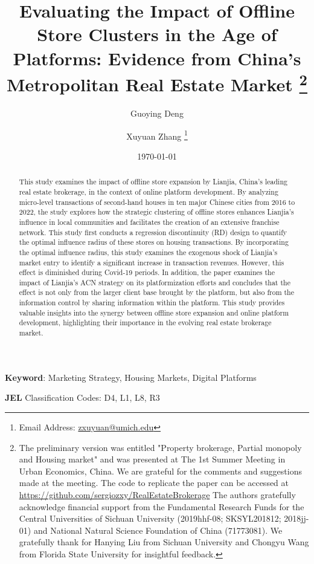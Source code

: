 \documentclass[12pt]{article}
\title{ \vspace*{-2.5cm} \hspace*{-0.5cm}Evaluating the Impact of Offline Store Clusters in the Age of Platforms: Evidence from China's Metropolitan Real Estate Market \footnote{
The preliminary version was entitled "Property brokerage, Partial monopoly and Housing market" and was presented at The 1st Summer Meeting in Urban Economics, China. We are grateful for the comments and suggestions made at the meeting. The code to replicate the paper can be accessed at \href{https://github.com/sergiozxy/RealEstateBrokerage}{https://github.com/sergiozxy/RealEstateBrokerage} The authors gratefully acknowledge financial support from the Fundamental Research Funds for the Central Universities of Sichuan University (2019hhf-08; SKSYL201812; 2018jj-01) and National Natural Science Foundation of China (71773081). We gratefully thank for Hanying Liu from Sichuan University and Chongyu Wang from Florida State University for insightful feedback.
}}
\date{ \vspace*{0.5cm} \today}
\begin{document}
\author[1]{Guoying Deng}
\author[2]{Xuyuan Zhang \thanks{Email Address: \href{mailto:zxuyuan@umich.edu}{zxuyuan@umich.edu}}}

\bgroup
\let\footnoterule\relax

\begin{singlespace}
\maketitle

\begin{abstract}
    \noindent This study examines the impact of offline store expansion by Lianjia, China's leading real estate brokerage, in the context of online platform development. By analyzing micro-level transactions of second-hand houses in ten major Chinese cities from 2016 to 2022, the study explores how the strategic clustering of offline stores enhances Lianjia's influence in local communities and facilitates the creation of an extensive franchise network. This study first conducts a regression discontinuity (RD) design to quantify the optimal influence radius of these stores on housing transactions. By incorporating the optimal influence radius, this study examines the exogenous shock of Lianjia's market entry to identify a significant increase in transaction revenues. However, this effect is diminished during Covid-19 periods. In addition, the paper examines the impact of Lianjia's ACN strategy on its platformization efforts and concludes that the effect is not only from the larger client base brought by the platform, but also from the information control by sharing information within the platform. This study provides valuable insights into the synergy between offline store expansion and online platform development, highlighting their importance in the evolving real estate brokerage market.
  \end{abstract}
  
  \textbf{Keyword}: Marketing Strategy, Housing Markets, Digital Platforms
  
  \textbf{JEL} Classification Codes: D4, L1, L8, R3
\end{singlespace}
\thispagestyle{empty}

\clearpage
\egroup
\setcounter{page}{1}

\end{document}
